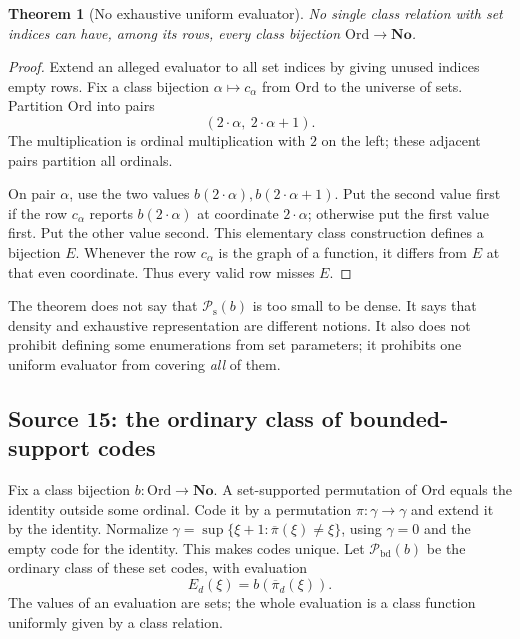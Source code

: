 \documentclass[11pt]{article}
\newtheorem{theorem}{Theorem}[section]
\theoremstyle{definition}
\theoremstyle{remark}
\newcommand{\No}{\mathbf{No}}
\newcommand{\Ord}{\mathrm{Ord}}
\newcommand{\Pbd}{\mathcal P_{\mathrm{bd}}}
\newcommand{\Psupp}{\mathcal P_{\mathrm{s}}}
\begin{document}
\begin{theorem}[No exhaustive uniform evaluator]\label{swo:fs:thm:diagonal}
No single class relation with set indices can have, among its rows,
every class bijection $\Ord\to\No$.
\end{theorem}
\begin{proof}
Extend an alleged evaluator to all set indices by giving unused
indices empty rows. Fix a class bijection $\alpha\mapsto c_\alpha$
from $\Ord$ to the universe of sets. Partition $\Ord$ into pairs
\[
                    (2\cdot\alpha,\ 2\cdot\alpha+1).
\]
The multiplication is ordinal multiplication with $2$ on the left;
these adjacent pairs partition all ordinals.

On pair $\alpha$, use the two values
$b(2\cdot\alpha),b(2\cdot\alpha+1)$. Put the second value first if
the row $c_\alpha$ reports $b(2\cdot\alpha)$ at coordinate
$2\cdot\alpha$; otherwise put the first value first. Put the other
value second. This elementary class construction defines a bijection
$E$. Whenever the row $c_\alpha$ is the graph of a function, it differs
from $E$ at that even coordinate. Thus every valid row misses $E$.
\end{proof}

The theorem does not say that $\Psupp(b)$ is too small to be dense. It says
that density and exhaustive representation are different notions. It
also does not prohibit defining some enumerations from set parameters;
it prohibits one uniform evaluator from covering \emph{all} of them.

\subsection{Source 15: the ordinary class of bounded-support codes}\label{swo:viii:sub:cb-core}

Fix a class bijection $b:\Ord\to\No$. A set-supported permutation
of $\Ord$ equals the identity outside some ordinal. Code it by a
permutation $\pi:\gamma\to\gamma$ and extend it by the identity.
Normalize
$\gamma=\sup\{\xi+1:\overline\pi(\xi)\ne\xi\}$,
using $\gamma=0$ and the empty code for the identity. This makes codes unique.
Let $\Pbd(b)$ be the ordinary class of these set codes, with evaluation
\[
 E_d(\xi)=b(\overline\pi_d(\xi)).
\]
The values of an evaluation are sets; the whole evaluation is a class
function uniformly given by a class relation.
\end{document}
